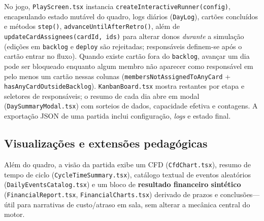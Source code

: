 No jogo, \texttt{PlayScreen.tsx} instancia \texttt{createInteractiveRunner(config)}, encapsulando estado mutável do quadro, logs diários (\texttt{DayLog}), cartões concluídos e métodos \texttt{step()}, \texttt{advanceUntilAfterRetro()}, além de \texttt{updateCardAssignees(cardId,\,ids)} para alterar donos \emph{durante} a simulação (edições em \texttt{backlog} e \texttt{deploy} são rejeitadas; responsáveis definem-se após o cartão entrar no fluxo). Quando existe cartão fora do \texttt{backlog}, avançar um dia pode ser bloqueado enquanto algum membro não aparecer como responsável em pelo menos um cartão nessas colunas (\texttt{membersNotAssignedToAnyCard} + \texttt{hasAnyCardOutsideBacklog}). \texttt{KanbanBoard.tsx} mostra restantes por etapa e seletores de responsáveis; o resumo de cada dia abre em modal (\texttt{DaySummaryModal.tsx}) com sorteios de dados, capacidade efetiva e contagens. A exportação JSON de uma partida inclui configuração, \emph{logs} e estado final.

\subsection{Visualizações e extensões pedagógicas}
Além do quadro, a visão da partida exibe um CFD (\texttt{CfdChart.tsx}), resumo de tempo de ciclo (\texttt{CycleTimeSummary.tsx}), catálogo textual de eventos aleatórios (\texttt{DailyEventsCatalog.tsx}) e um bloco de \textbf{resultado financeiro sintético} (\texttt{FinancialReport.tsx}, \texttt{FinancialCharts.tsx}) derivado de prazos e conclusões---útil para narrativas de custo/atraso em sala, sem alterar a mecânica central do motor.

